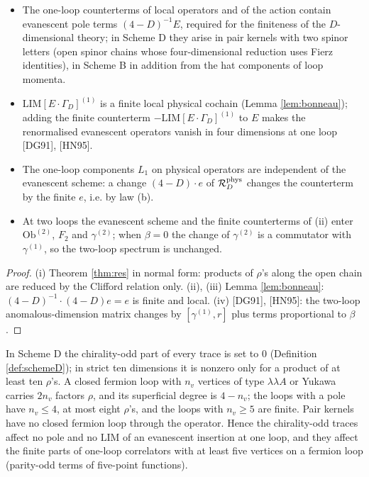 \begin{proposition}
\label{prop:evan}
\mbox{}\begin{itemize}
\item[(i)] The one-loop counterterms of local operators and of the action contain evanescent pole terms $(4-D)^{-1}E$, required for the finiteness of the $D$-dimensional theory; in Scheme D they arise in pair kernels with two spinor letters (open spinor chains whose four-dimensional reduction uses Fierz identities), in Scheme B in addition from the hat components of loop momenta.
\item[(ii)] $\mathrm{LIM}[E\cdot\Gamma_D]^{(1)}$ is a finite local physical cochain (Lemma \ref{lem:bonneau}); adding the finite counterterm $-\mathrm{LIM}[E\cdot\Gamma_D]^{(1)}$ to $E$ makes the renormalised evanescent operators vanish in four dimensions at one loop [DG91], [HN95].
\item[(iii)] The one-loop components $L_1$ on physical operators are independent of the evanescent scheme: a change $(4-D)\cdot e$ of $\mathcal R^{\rm phys}_D$ changes the counterterm by the finite $e$, i.e. by law (b).
\item[(iv)] At two loops the evanescent scheme and the finite counterterms of (ii) enter $\mathrm{Ob}^{(2)}$, $F_2$ and $\gamma^{(2)}$; when $\beta=0$ the change of $\gamma^{(2)}$ is a commutator with $\gamma^{(1)}$, so the two-loop spectrum is unchanged.
\end{itemize}
\end{proposition}

\begin{proof}
(i) Theorem \ref{thm:res} in normal form: products of $\rho$'s along the open chain are reduced by the Clifford relation only. (ii), (iii) Lemma \ref{lem:bonneau}: $(4-D)^{-1}\cdot(4-D)e=e$ is finite and local. (iv) [DG91], [HN95]: the two-loop anomalous-dimension matrix changes by $[\gamma^{(1)},r]$ plus terms proportional to $\beta$.
\end{proof}

\begin{remark}
\label{rem:g11}
In Scheme D the chirality-odd part of every trace is set to $0$ (Definition \ref{def:schemeD}); in strict ten dimensions it is nonzero only for a product of at least ten $\rho$'s. A closed fermion loop with $n_v$ vertices of type $\lambda\lambda A$ or Yukawa carries $2n_v$ factors $\rho$, and its superficial degree is $4-n_v$; the loops with a pole have $n_v\le4$, at most eight $\rho$'s, and the loops with $n_v\ge5$ are finite. Pair kernels have no closed fermion loop through the operator. Hence the chirality-odd traces affect no pole and no $\mathrm{LIM}$ of an evanescent insertion at one loop, and they affect the finite parts of one-loop correlators with at least five vertices on a fermion loop (parity-odd terms of five-point functions).
\end{remark}
